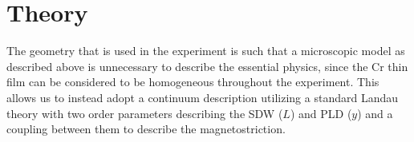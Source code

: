 \section{Theory}


The geometry that is used in the experiment is such that a microscopic model as described above is unnecessary to describe the essential physics, since the Cr thin film can be considered to be homogeneous throughout the experiment. This allows us to instead adopt a continuum description utilizing a standard Landau theory with two order parameters describing the SDW ($L$) and PLD ($y$) and a coupling between them to describe the magnetostriction.  

